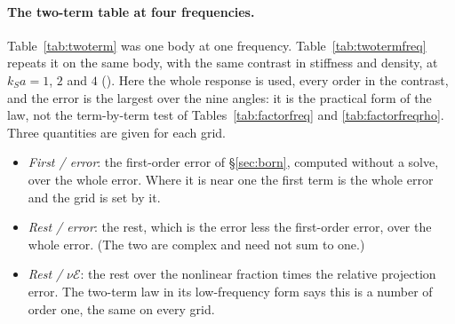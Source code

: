 \documentclass[11pt,a4paper]{article}
\newcommand{\cE}{\mathcal{E}}
\begin{document}
\paragraph{The two-term table at four frequencies.} Table~\ref{tab:twoterm} was one body at one
frequency. Table~\ref{tab:twotermfreq} repeats it on the same body, with the same contrast in stiffness
and density, at $k_Sa=1$, $2$ and $4$ (). Here the whole response
is used, every order in the contrast, and the error is the largest over the nine angles: it is the
practical form of the law, not the term-by-term test of Tables~\ref{tab:factorfreq} and
\ref{tab:factorfreqrho}. Three quantities are given for each grid.
\begin{itemize}
\item \emph{First / error}: the first-order error of \S\ref{sec:born}, computed without a solve, over the
whole error. Where it is near one the first term is the whole error and the grid is set by it.
\item \emph{Rest / error}: the rest, which is the error less the first-order error, over the whole error.
(The two are complex and need not sum to one.)
\item \emph{Rest /} $\nu\cE$: the rest over the nonlinear fraction times the relative projection error.
The two-term law in its low-frequency form says this is a number of order one, the same on every grid.
\end{itemize}
\end{document}
